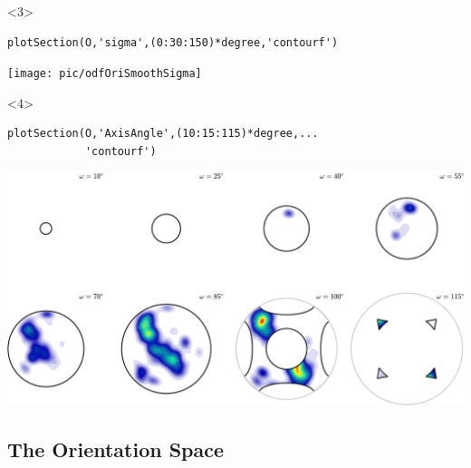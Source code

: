 \documentclass[compress]{beamer}
\begin{document}
\begin{frame}[fragile]
    \begin{onlyenv}<3>
    \begin{lstlisting}[style=input]
plotSection(O,'sigma',(0:30:150)*degree,'contourf')
    \end{lstlisting}
    \vspace{-0.3cm}
    \begin{center}
      \texttt{[image: pic/odfOriSmoothSigma]}
    \end{center}
  \end{onlyenv}

  \begin{onlyenv}<4>
    \begin{lstlisting}[style=input]
plotSection(O,'AxisAngle',(10:15:115)*degree,...
            'contourf')
    \end{lstlisting}
    \vspace{-0.3cm}
    \begin{center}
      \includegraphics[width=\textwidth]{pic/odfOriSmoothAxisAngle}
    \end{center}
  \end{onlyenv}

\end{frame}

\subsection*{The Orientation Space}
\end{document}
